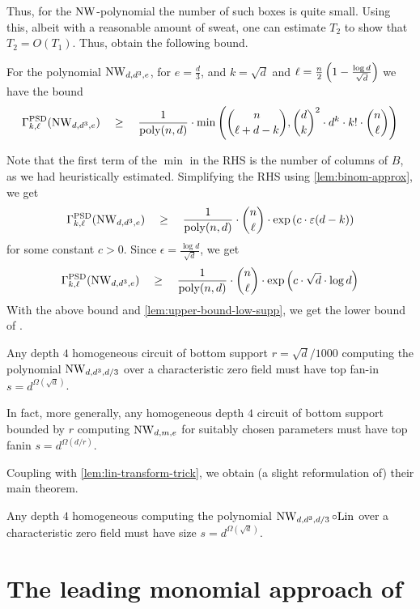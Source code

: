 Thus, for the $\operatorname{\mathrm{NW}}$-polynomial the number of such boxes is quite small. 
Using this, albeit with a reasonable amount of sweat, one can estimate $T_2$ to show that $T_2 = O(T_1)$. 
Thus, \cite{KLSS} obtain the following bound. 

\begin{lemma}
For the polynomial $\operatorname{\mathrm{NW}}_{d,d^3,e}$, for $e = \frac{d}{3}$, and $k = \sqrt{d}$ and $\ell = \frac{n}{2}\left(1 - \frac{\log d}{\sqrt{d}}\right)$ we have the bound
\[
\Gamma^{\mathrm{PSD}}_{k,\ell}(\operatorname{\mathrm{NW}}_{d,d^3,e}) \quad \geq \quad \frac{1}{\operatorname{poly}(n,d)} \cdot \min\left(\binom{n}{\ell + d - k}, \binom{d}{k}^2 \cdot d^k \cdot k! \cdot \binom{n}{\ell}\right)
\]
\end{lemma}
Note that the first term of the $\min$ in the RHS is the number of columns of $B$, as we had heuristically estimated. 
Simplifying the RHS using \autoref{lem:binom-approx}, we get
\[
\Gamma^{\mathrm{PSD}}_{k,\ell}(\operatorname{\mathrm{NW}}_{d,d^3,e}) \quad \geq \quad \frac{1}{\operatorname{poly}(n,d)} \cdot \binom{n}{\ell}\cdot \exp\left(c\cdot \varepsilon (d - k)\right)
\]
for some constant $c > 0$. 
Since $\epsilon = \frac{\log d}{\sqrt{d}}$, we get 
\[
\Gamma^{\mathrm{PSD}}_{k,\ell}(\operatorname{\mathrm{NW}}_{d,d^3,e}) \quad \geq \quad \frac{1}{\operatorname{poly}(n,d)} \cdot \binom{n}{\ell}\cdot \exp\left(c\cdot \sqrt{d}\cdot \log d\right)
\]
With the above bound and \autoref{lem:upper-bound-low-supp}, we get the lower bound of \cite{KLSS}. 
\begin{theorem}\label{thm:KLSS-lowsupp}
Any depth $4$ homogeneous circuit of bottom support $r = \sqrt{d}/1000$ computing the polynomial $\operatorname{\mathrm{NW}}_{d,d^3,d/3}$ over a characteristic zero field must have top fan-in $s = d^{\Omega(\sqrt{d})}$. 

In fact, more generally, any homogeneous depth $4$ circuit of bottom support bounded by $r$ computing $\operatorname{\mathrm{NW}}_{d,m,e}$ for suitably chosen parameters must have top fanin $s = d^{\Omega(d/r)}$. 
\end{theorem}

Coupling with \autoref{lem:lin-transform-trick}, we obtain (a slight reformulation of) their main theorem. 

\begin{theorem}\label{thm:KLSS-main}
Any depth $4$ homogeneous computing the polynomial $\operatorname{\mathrm{NW}}_{d,d^3,d/3}\circ \mathrm{Lin}$ over a characteristic zero field must have size $s = d^{\Omega(\sqrt{d})}$. 
\end{theorem}

\section{The leading monomial approach of \cite{KS14}}

